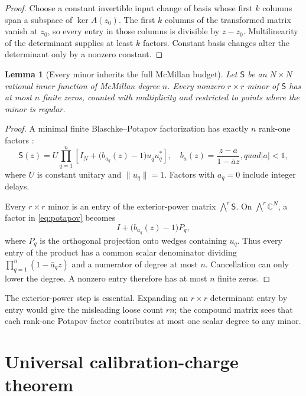 \documentclass[11pt]{article}
\newtheorem{lemma}[theorem]{Lemma}
\theoremstyle{definition}
\theoremstyle{remark}
\newcommand{\C}{\mathbb{C}}
\begin{document}
\begin{proof}
Choose a constant invertible input change of basis whose first $k$ columns
span a subspace of $\ker A(z_0)$.  The first $k$ columns of the transformed
matrix vanish at $z_0$, so every entry in those columns is divisible by
$z-z_0$.  Multilinearity of the determinant supplies at least $k$ factors.
Constant basis changes alter the determinant only by a nonzero constant.
\end{proof}

\begin{lemma}[Every minor inherits the full McMillan budget]
\label{lem:minordegree}
Let $\mathsf S$ be an $N\times N$ rational inner function of McMillan degree
$n$.  Every nonzero $r\times r$ minor of $\mathsf S$ has at most $n$ finite
zeros, counted with multiplicity and restricted to points where the minor is
regular.
\end{lemma}

\begin{proof}
A minimal finite Blaschke--Potapov factorization has exactly $n$ rank-one
factors \cite{AlpayJorgensenLewkowicz2016}:
\begin{equation}\label{eq:potapov}
 \mathsf S(z)=U\prod_{q=1}^{n}
 \left[I_N+\bigl(b_{a_q}(z)-1\bigr)u_qu_q^*\right],
 \quad
 b_a(z)=\frac{z-a}{1-\bar a z},quad |a|<1,
\end{equation}
where $U$ is constant unitary and $\|u_q\|=1$.  Factors with $a_q=0$
include integer delays.

Every $r\times r$ minor is an entry of the exterior-power matrix
$\bigwedge^r\mathsf S$.  On $\bigwedge^r\C^N$, a factor in
\eqref{eq:potapov} becomes
\[
 I+\bigl(b_{a_q}(z)-1\bigr)P_q,
\]
where $P_q$ is the orthogonal projection onto wedges containing $u_q$.
Thus every entry of the product has a common scalar denominator dividing
$\prod_{q=1}^n(1-\bar a_qz)$ and a numerator of degree at most $n$.
Cancellation can only lower the degree.  A nonzero entry therefore has at
most $n$ finite zeros.
\end{proof}

The exterior-power step is essential.  Expanding an $r\times r$ determinant
entry by entry would give the misleading loose count $rn$; the compound
matrix sees that each rank-one Potapov factor contributes at most one scalar
degree to any minor.

\section{Universal calibration-charge theorem}
\end{document}
